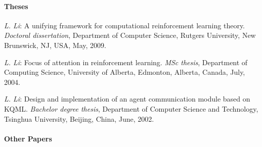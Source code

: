 \documentclass[10pt,twoside,letterpaper]{article}
\newcommand{\selffont}[1]{{\textit{#1}}}
\newcommand{\venuefont}[1]{{\textit{#1}}}
\newcommand{\negitemspace}{\vspace{1mm}}
\newcommand{\myself}{\selffont{L. Li}}
\begin{document}
\paragraph{Theses} \negitemspace

\begin{compactenum}[(T1)]

\item{\myself: A unifying framework for computational
reinforcement learning theory. \venuefont{Doctoral dissertation},
Department of Computer Science, Rutgers University, New Brunswick,
NJ, USA, May, 2009.}

\item{\myself: Focus of attention in reinforcement learning.
\venuefont{MSc thesis}, Department of Computing Science, University
of Alberta, Edmonton, Alberta, Canada, July, 2004.}

\item{\myself: Design and implementation of an agent
communication module based on KQML. \venuefont{Bachelor degree
thesis}, Department of Computer Science and Technology, Tsinghua
University, Beijing, China, June, 2002.}

\end{compactenum} \negitemspace

\paragraph{Other Papers} \negitemspace
\end{document}
